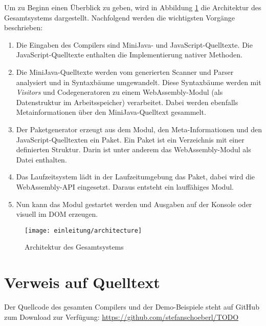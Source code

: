 Um zu Beginn einen Überblick zu geben, wird in Abbildung \ref{fig:architecture} die Architektur des Gesamtsystems dargestellt. Nachfolgend werden die wichtigsten Vorgänge beschrieben:

\begin{enumerate}
    \item Die Eingaben des Compilers sind MiniJava- und Ja\-va\-Script-Quelltexte. Die Ja\-va\-Script-Quelltexte enthalten die Implementierung nativer Methoden.
    \item Die MiniJava-Quelltexte werden vom generierten Scanner und Parser analysiert und in Syntaxbäume umgewandelt. Diese Syntaxbäume werden mit \emph{Visitors} und Codegeneratoren zu einem WebAssembly-Modul (als Datenstruktur im Arbeitsspeicher) verarbeitet. Dabei werden ebenfalls Metainformationen über den Mi\-ni\-Ja\-va-Quelltext gesammelt.
    \item Der Paketgenerator erzeugt aus dem Modul, den Meta-Informationen und den JavaScript-Quelltexten ein Paket. Ein Paket ist ein Verzeichnis mit einer definierten Struktur. Darin ist unter anderem das WebAssembly-Modul als Datei enthalten.
    \item Das Laufzeitsystem lädt in der Laufzeitumgebung das Paket, dabei wird die Web\-As\-sem\-bly-API eingesetzt. Daraus entsteht ein lauffähiges Modul.
    \item Nun kann das Modul gestartet werden und Ausgaben auf der Konsole oder visuell im DOM erzeugen.
\end{enumerate}


\begin{figure}[]
    \centering
    \texttt{[image: einleitung/architecture]}
    \caption{Architektur des Gesamtsystems}
    \label{fig:architecture}
\end{figure}

\section{Verweis auf Quelltext}
Der Quellcode des gesamten Compilers und der Demo-Beispiele steht auf GitHub zum Download zur Verfügung: \url{https://github.com/stefanschoeberl/TODO}
